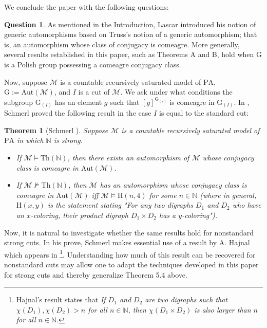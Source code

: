 \documentclass[11pt]{article}
\newtheorem{theorem}{Theorem}[section]
\theoremstyle{plain}
\theoremstyle{definition}
\newtheorem{q}{Question}
\newcommand{\M}{\mathcal{M}}
\newcommand{\NN}{\mathbb{N}}
\newcommand{\G}{\mathrm{G}}
\newcommand{\A}{\mathrm{Aut}}
\newcommand{\pa}{\mathrm{PA}}
\begin{document}
We conclude the paper with the following questions:
\begin{q}
As mentioned in the Introduction, Lascar introduced his notion of generic automorphisms based on Truss's notion of a generic automorphism; that is, an automorphism whose class of conjugacy is comeagre. More generally, several results established in this paper, such as Theorems A and B, hold when $\G$ is a Polish group possessing a comeagre conjugacy class. 

Now, suppose $\M$ is a countable recursively saturated model of $\pa$, $\G:=\A(\M)$, and $I$ is a cut of $\M$.  We ask under what conditions the subgroup $\G_{(I)}$ has an element $g$ such that $[g]^{\G_{(I)}}$ is comeagre in $\G_{(I)}$. In \cite{sch}, Schmerl proved the following result in the case $I$ is equal to the standard cut:
\begin{theorem}[Schmerl \cite{sch}]
Suppose $\M$ is a countable recursively saturated model of $\pa$ in which $\NN$ is strong. 
\begin{itemize}
\item[(1)] If $\M\models\mathrm{Th}(\NN)$, then there exists an automorphism of $\M$ whose conjugacy class is comeagre in $\A(\M)$.
\item[(2)] If $\M\nvDash\mathrm{Th}(\NN)$, then $\M$ has an automorphism  whose conjugacy class is comeagre in $\A(\M)$  iff $\M\models\mathrm{H}(n,4)$ for some $n\in\NN$ (where in general, $ \mathrm{H}(x,y)$ is the statement stating "\textit{For any two digraphs $D_{1}$ and $D_{2}$ who have an $x$-coloring, their product digraph $D_{1}\times D_{2}$ has a $y$-coloring}"). 
\end{itemize}
\end{theorem}
Now, it is natural to investigate whether the same results hold for nonstandard strong cuts. In his prove, Schmerl makes essential use of a result by A. Hajnal which appears in \cite{haj}\footnote{Hajnal's result states that \textit{If $D_{1}$ and $D_{2}$ are two digraphs such that $\chi(D_{1}),\chi(D_{2})>n $ for all $n\in\NN$, then $\chi(D_{1}\times D_{2})$ is also larger than  $n $ for all $n\in\NN$}.}. Understanding how much of this result can be recovered for nonstandard cuts may allow one to adapt the techniques developed in this paper for strong cuts and thereby generalize Theorem 5.4 above.
\end{q}
\end{document}
